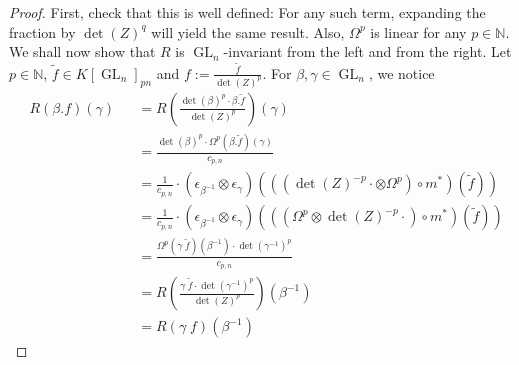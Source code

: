 \begin{proof}
  First, check that this is well defined:
  For any such term, expanding the fraction by $ \operatorname{det} (Z)^q $ will yield the same result.
  Also, $\Omega^p$ is linear for any $p \in \mathbb{N}$.
  We shall now show that $R$ is $\operatorname{GL}_n$-invariant from the left and from the right.
  Let $p \in \mathbb{N}$, $ \tilde{f} \in K \left\lbrack \operatorname{GL}_n \right\rbrack_{pn} $ and $ f := \frac{\tilde{f}}{\operatorname{det}(Z)^p} $.
  For $ \beta , \gamma \in \operatorname{GL}_n $, we notice
  \begin{equation}
    \begin{aligned}
      &R \left( \beta . f \right) (\gamma)
      &&= R \left( \frac{ \operatorname{det} (\beta)^p \cdot \beta . \tilde{f}}{\operatorname{det} (Z)^p} \right) (\gamma)  \\
      &&&= \frac{ \operatorname{det} (\beta)^p \cdot \Omega^p \left( \beta . \tilde{f} \right) (\gamma) }{ c_{p,n} } \\
      &&&= \frac{1}{c_{p,n}} \cdot \left( \epsilon_{\beta^{-1}} \otimes \epsilon_\gamma \right) \left( \left( \left( \operatorname{det}(Z)^{-p} \cdot \otimes \Omega^p \right) \circ m^\ast \right) \left( \tilde{f} \right) \right) \\
      &&&= \frac{1}{c_{p,n}} \cdot \left( \epsilon_{\beta^{-1}} \otimes \epsilon_\gamma \right) \left( \left( \left( \Omega^p \otimes \operatorname{det}(Z)^{-p} \cdot \right) \circ m^\ast \right) \left( \tilde{f} \right) \right) \\
      &&&= \frac{ \Omega^p \left( \gamma \dot{\phantom{.}} \tilde{f} \right) (\beta^{-1}) \cdot \operatorname{det} \left (\gamma^{-1} \right)^p }{ c_{p,n} }  \\
      &&&= R \left( \frac{ \gamma \dot{\phantom{.}} \tilde{f} \cdot \operatorname{det} \left( \gamma^{-1} \right)^p }{\operatorname{det} (Z)^p} \right) \left( \beta^{-1} \right)  \\
      &&&= R \left( \gamma \dot{\phantom{.}} f \right) \left( \beta^{-1} \right)
    \end{aligned}

\end{equation}
\end{proof}
